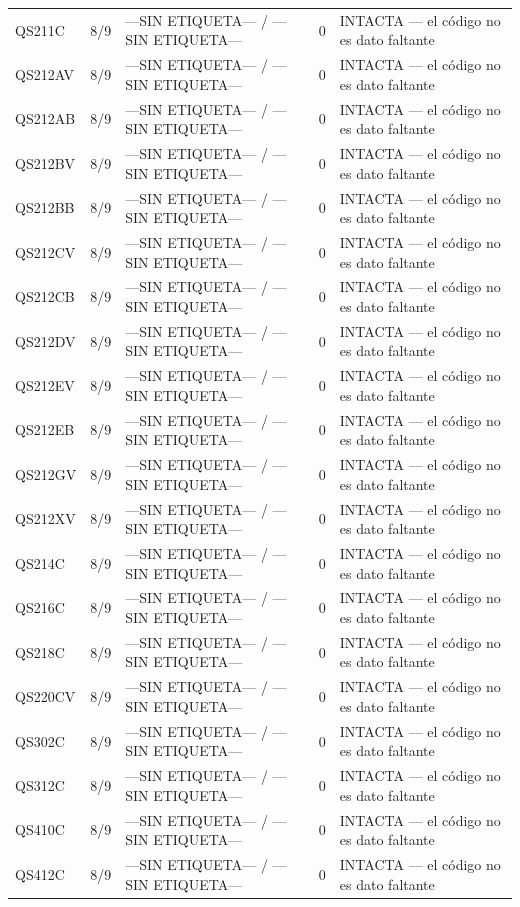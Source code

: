 \begin{longtable}{lllrl}
QS211C & 8/9 & —SIN ETIQUETA— / —SIN ETIQUETA— & 0 & INTACTA — el código no es dato faltante \\
QS212AV & 8/9 & —SIN ETIQUETA— / —SIN ETIQUETA— & 0 & INTACTA — el código no es dato faltante \\
QS212AB & 8/9 & —SIN ETIQUETA— / —SIN ETIQUETA— & 0 & INTACTA — el código no es dato faltante \\
QS212BV & 8/9 & —SIN ETIQUETA— / —SIN ETIQUETA— & 0 & INTACTA — el código no es dato faltante \\
QS212BB & 8/9 & —SIN ETIQUETA— / —SIN ETIQUETA— & 0 & INTACTA — el código no es dato faltante \\
QS212CV & 8/9 & —SIN ETIQUETA— / —SIN ETIQUETA— & 0 & INTACTA — el código no es dato faltante \\
QS212CB & 8/9 & —SIN ETIQUETA— / —SIN ETIQUETA— & 0 & INTACTA — el código no es dato faltante \\
QS212DV & 8/9 & —SIN ETIQUETA— / —SIN ETIQUETA— & 0 & INTACTA — el código no es dato faltante \\
QS212EV & 8/9 & —SIN ETIQUETA— / —SIN ETIQUETA— & 0 & INTACTA — el código no es dato faltante \\
QS212EB & 8/9 & —SIN ETIQUETA— / —SIN ETIQUETA— & 0 & INTACTA — el código no es dato faltante \\
QS212GV & 8/9 & —SIN ETIQUETA— / —SIN ETIQUETA— & 0 & INTACTA — el código no es dato faltante \\
QS212XV & 8/9 & —SIN ETIQUETA— / —SIN ETIQUETA— & 0 & INTACTA — el código no es dato faltante \\
QS214C & 8/9 & —SIN ETIQUETA— / —SIN ETIQUETA— & 0 & INTACTA — el código no es dato faltante \\
QS216C & 8/9 & —SIN ETIQUETA— / —SIN ETIQUETA— & 0 & INTACTA — el código no es dato faltante \\
QS218C & 8/9 & —SIN ETIQUETA— / —SIN ETIQUETA— & 0 & INTACTA — el código no es dato faltante \\
QS220CV & 8/9 & —SIN ETIQUETA— / —SIN ETIQUETA— & 0 & INTACTA — el código no es dato faltante \\
QS302C & 8/9 & —SIN ETIQUETA— / —SIN ETIQUETA— & 0 & INTACTA — el código no es dato faltante \\
QS312C & 8/9 & —SIN ETIQUETA— / —SIN ETIQUETA— & 0 & INTACTA — el código no es dato faltante \\
QS410C & 8/9 & —SIN ETIQUETA— / —SIN ETIQUETA— & 0 & INTACTA — el código no es dato faltante \\
QS412C & 8/9 & —SIN ETIQUETA— / —SIN ETIQUETA— & 0 & INTACTA — el código no es dato faltante \\

\end{longtable}
